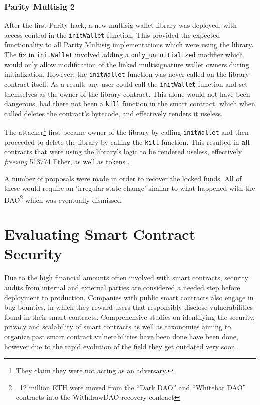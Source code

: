 \subsubsection{Parity Multisig 2}
After the first Parity hack, a new multisig wallet library was deployed, with access control in the \texttt{initWallet} function. This provided the expected functionality to all Parity Multisig implementations which were using the library. The fix in \texttt{initWallet} involved adding a \texttt{only\_uninitialized} modifier which would only allow modification of the linked multisignature wallet owners during initialization. However, the \texttt{initWallet} function was never called on the library contract itself. As a result, any user could call the \texttt{initWallet} function and set themselves as the owner of the library contract. This alone would not have been dangerous, had there not been a \texttt{kill} function in the smart contract, which when called deletes the contract's bytecode, and effectively renders it useless. 

The attacker\footnote{They claim they were not acting as an adversary.} first became owner of the library by calling \texttt{initWallet} and then proceeded to delete the library by calling the \texttt{kill} function. This resulted in \textbf{all} contracts that were using the library's logic to be rendered useless, effectively \textit{freezing} 513774 Ether, as well as tokens \cite{paritypostmortem}. 

A number of proposals were made \cite{eip867} in order to recover the locked funds. All of these would require an `irregular state change' similar to what happened with the DAO\footnote{~12 million ETH were moved from the “Dark DAO” and “Whitehat DAO” contracts into the WithdrawDAO recovery contract\cite{daofork2}} which was eventually dismissed. 

\section{Evaluating Smart Contract Security}
Due to the high financial amounts often involved with smart contracts, security audits from internal and external parties are considered a needed step before deployment to production. Companies with public smart contracts also engage in bug-bounties, in which they reward users that responsibly disclose vulnerabilities found in their smart contracts. Comprehensive studies on identifying the security, privacy and scalability of smart contracts \cite{DBLP:journals/corr/abs-1710-06372} as well as taxonomies aiming to organize past smart contract vulnerabilities have been done \cite{Atzei:2017:SAE:3080353.3080363,tools} have been done, however due to the rapid evolution of the field they get outdated very soon. 


